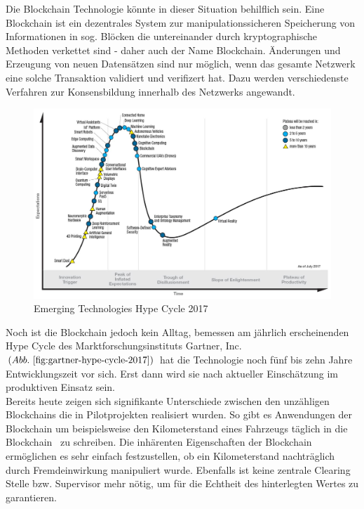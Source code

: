 Die Blockchain Technologie könnte in dieser Situation behilflich sein. Eine Blockchain ist ein dezentrales System zur manipulationssicheren Speicherung von Informationen in sog. Blöcken die untereinander durch kryptographische Methoden verkettet sind - daher auch der Name Blockchain. Änderungen und Erzeugung von neuen Datensätzen sind nur möglich, wenn das gesamte Netzwerk eine solche Transaktion validiert und verifizert hat. Dazu werden verschiedenste Verfahren zur Konsensbildung innerhalb des Netzwerks angewandt.\\


\begin{figure}[h!]
	\centering
	\includegraphics[width=0.65\linewidth]{pictures/Gartner-Hype-Cycle-2017}
	\caption[Gartner Hype Cycle 2017]{Emerging Technologies Hype Cycle 2017\cite{Gartner2017}}
	\label{fig:gartner-hype-cycle-2017}
\end{figure}

Noch ist die Blockchain jedoch kein Alltag, bemessen am jährlich erscheinenden Hype Cycle des Marktforschungsinstituts Gartner, Inc. $( Abb.~ \ref{fig:gartner-hype-cycle-2017} )$ hat die Technologie noch fünf bis zehn Jahre Entwicklungszeit vor sich. Erst dann wird sie nach aktueller Einschätzung im produktiven Einsatz sein.\\

Bereits heute zeigen sich signifikante Unterschiede zwischen den unzähligen Blockchains die in Pilotprojekten realisiert wurden. So gibt es Anwendungen der Blockchain um beispielsweise den Kilometerstand eines Fahrzeugs täglich \glqq in die Blockchain\grqq~ zu schreiben. Die inhärenten Eigenschaften der Blockchain ermöglichen es sehr einfach festzustellen, ob ein Kilometerstand nachträglich durch Fremdeinwirkung manipuliert wurde. Ebenfalls ist keine zentrale \glqq Clearing Stelle\grqq{} bzw. Supervisor mehr nötig, um für die Echtheit des hinterlegten Wertes zu garantieren. \cite{carVertical}\\


